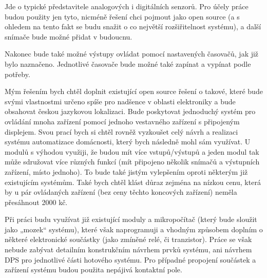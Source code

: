 Jde o typické představitele analogových i digitálních senzorů. Pro účely práce budou použity jen tyto, nicméně řešení chci pojmout jako open source (a s ohledem na tento fakt se budu snažit o co největší rozšiřitelnost systému), a další snímače bude možné přidat v budoucnu.

Nakonec bude také možné výstupy ovládat pomocí nastavených časovačů, jak již bylo naznačeno. Jednotlivé časovače bude možné také zapínat a vypínat podle potřeby.


Mým řešením bych chtěl doplnit existující open source řešení o takové, které bude svými vlastnostmi určeno spíše pro nadšence v oblasti elektroniky a bude obsahovat českou jazykovou lokalizaci. Bude poskytovat jednoduchý systém pro ovládání mnoha zařízení pomocí jednoho vestavného zařízení s připojeným displejem. Svou prací bych si chtěl rovněž vyzkoušet celý návrh a realizaci systému automatizace domácnosti, který bych následně mohl sám využívat. U modulů s výhodou využiji, že budou mít více vstupů/výstupů a jeden modul tak může sdružovat více různých funkcí (mít připojeno několik snímačů a výstupních zařízení, místo jednoho). To bude také jistým vylepšením oproti některým již existujícím systémům. Také bych chtěl klást důraz zejména na nízkou cenu, která by u pár ovládaných zařízení (bez ceny těchto koncových zařízení) neměla přesáhnout 2000 kč.

Při práci budu využívat již existující moduly a mikropočítač (který bude sloužit jako „mozek“ systému), které však naprogramuji a vhodným způsobem doplním o některé elektronické součástky (jako zmíněné relé, či tranzistor). Práce se však nebude zabývat detailním konstrukčním návrhem prvků systému, ani návrhem DPS pro jednotlivé části hotového systému. Pro případné propojení součástek a zařízení systému budou použita nepájivá kontaktní pole.

